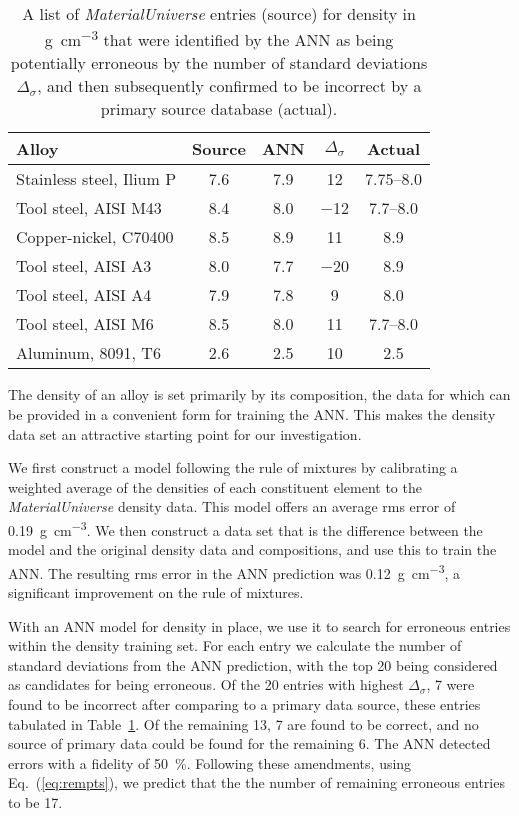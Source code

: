 \documentclass[review]{elsarticle}
\newcommand{\eqnref}[1]{Eq.~(\ref{#1})}
\newcommand{\tabref}[1]{Table~\ref{#1}}
\begin{document}
\begin{table}
  \caption{A list of \textit{MaterialUniverse} entries (source)
    for density in \si{\gram\per\cubic\centi\meter} that were
    identified by the ANN as being potentially 
    erroneous by the number of standard deviations $\Delta_{\sigma}$, and then
    subsequently confirmed to be incorrect by a primary source database (actual).}

\begin{tabular}{lcccc}
 \bf{Alloy}&
 \bf{Source}& 
 \bf{ANN}& 
 $\Delta_\sigma$&
 \bf{Actual}\\
 \hline
 Stainless steel, Ilium P&
 \num{7.6}&\num{7.9}&\num{12}&\numrange{7.75}{8.0}\cite{MatWeb}\\
 Tool steel, AISI M43& 
 \num{8.4}&\num{8.0}&\num{-12}&\numrange{7.7}{8.0}\cite{MatWeb}\\
 Copper-nickel, C70400&
 \num{8.5}&\num{8.9}&\num{11}&\num{8.9}\cite{MatWeb}\\
 Tool steel, AISI A3&
 \num{8.0}&\num{7.7}&\num{-20}&\num{8.9}\cite{MatWeb}\\
 Tool steel, AISI A4&
 \num{7.9}&\num{7.8}&\num{9}&\num{8.0}\cite{MatWeb}\\
 Tool steel, AISI M6&
 \num{8.5}&\num{8.0}&\num{11}&\numrange{7.7}{8.0}\cite{MatWeb}\\
 Aluminum, 8091, T6&
 \num{2.6}&\num{2.5}&\num{10}&\num{2.5}\cite{MatWeb}
\end{tabular}
  \label{tab:4-01-densities}
\end{table}

The density of an alloy is set primarily by its composition, the data for
which can be provided in a convenient form for training the ANN. This makes
the density data set an attractive starting point for our investigation.

We first construct a model following the rule of mixtures by calibrating a
weighted average of the densities of each constituent element to the
\textit{MaterialUniverse} density data. This model offers an average rms
error of \SI{0.19}{\gram\per\cubic\centi\meter}. We then construct a data
set that is the difference between the model and the original density data
and compositions, and use this to train the ANN. The resulting rms error in
the ANN prediction was \SI{0.12}{\gram\per\cubic\centi\meter}, a significant
improvement on the rule of mixtures.

With an ANN model for density in place, we use it to search for erroneous
entries within the density training set. For each entry we calculate the
number of standard deviations from the ANN prediction, with the top 20 being
considered as candidates for being erroneous. Of the 20 entries with highest
$\Delta_\sigma$, 7 were found to be incorrect after comparing to a primary
data source, these entries tabulated in \tabref{tab:4-01-densities}. Of the
remaining 13, 7 are found to be correct, and no source of primary data could
be found for the remaining 6. The ANN detected errors with a fidelity of
\SI{50}{\percent}. Following these amendments, using \eqnref{eq:rempts}, we
predict that the the number of remaining erroneous entries to be 17.
\end{document}
